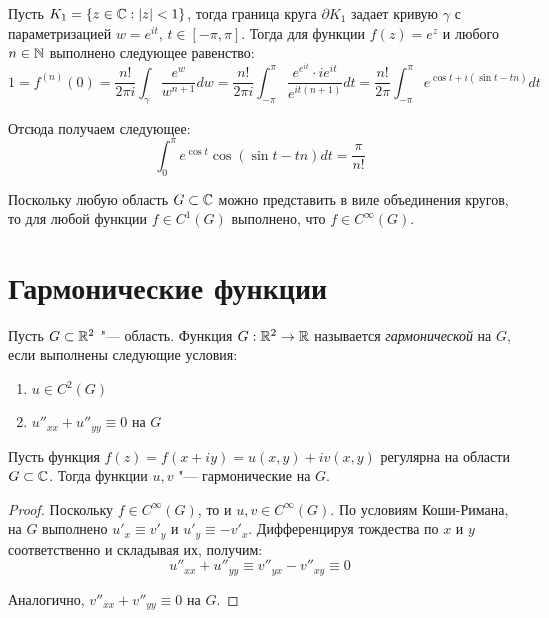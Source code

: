 \begin{example}
	Пусть $K_1 = \{z \in \mathbb{C}: |z| < 1\}$, тогда граница круга $\partial K_1$ задает кривую $\gamma$ с параметризацией $w = e^{it}$, $t \in [-\pi, \pi]$. Тогда для функции $f(z) = e^z$ и любого $n \in \mathbb{N}$ выполнено следующее равенство:
	\[1 = f^{(n)}(0) = \frac{n!}{2\pi i} \int_\gamma \frac{e^w}{w^{n+1}}dw = \frac{n!}{2\pi i} \int_{-\pi}^\pi \frac{e^{e^{it}}\cdot ie^{it}}{e^{it(n+1)}}dt = \frac{n!}{2\pi} \int_{-\pi}^\pi e^{\cos{t} + i(\sin{t} - tn)}dt\]
	
	Отсюда получаем следующее:
	\[\int_{0}^\pi e^{\cos{t}}\cos{(\sin{t} - tn)}dt = \frac\pi{n!}\]
\end{example}

\begin{note}
	Поскольку любую область $G \subset \mathbb{C}$ можно представить в виле объединения кругов, то для любой функции $f \in C^1(G)$ выполнено, что $f \in C^\infty(G)$.
\end{note}

\section{Гармонические функции}

\begin{definition}
	Пусть $G \subset \mathbb{R}^2$ "--- область. Функция $G : \mathbb{R}^2 \to \mathbb{R}$ называется \textit{гармонической} на $G$, если выполнены следующие условия:
	\begin{enumerate}
		\item $u \in C^2(G)$
		\item $u''_{xx} + u''_{yy} \equiv 0$ на $G$
	\end{enumerate}
\end{definition}

\pagebreak
\begin{proposition}
	Пусть функция $f(z) = f(x + iy) = u(x, y) + iv(x, y)$ регулярна на области $G \subset \mathbb{C}$. Тогда функции $u, v$ "--- гармонические на $G$.
\end{proposition}

\begin{proof}
	Поскольку $f \in C^\infty(G)$, то и $u, v \in C^\infty(G)$. По условиям Коши-Римана, на $G$ выполнено $u'_x \equiv v'_y$ и $u'_y \equiv -v'_x$. Дифференцируя тождества по $x$ и $y$ соответственно и складывая их, получим:
	\[u''_{xx} + u''_{yy} \equiv v''_{yx} - v''_{xy} \equiv 0\]
	
	Аналогично, $v''_{xx} + v''_{yy} \equiv 0$ на $G$.
\end{proof}

